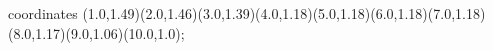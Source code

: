 					coordinates { (1.0,1.49)(2.0,1.46)(3.0,1.39)(4.0,1.18)(5.0,1.18)(6.0,1.18)(7.0,1.18)(8.0,1.17)(9.0,1.06)(10.0,1.0)};